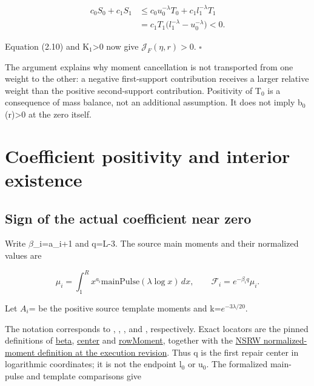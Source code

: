 \documentclass[11pt,a4paper]{article}
\begin{document}
\[
\begin{aligned}
c_0S_0+c_1S_1
&\le c_0u_0^{-\lambda}T_0+c_1l_1^{-\lambda}T_1\\
&=c_1T_1\bigl(l_1^{-\lambda}-u_0^{-\lambda}\bigr)<0.
\end{aligned} \tag{4.3}
\]

Equation (2.10) and K\ensuremath{{}_1}>0 now give \(\mathcal J_F(\eta,r)>0\). \hfill\ensuremath{\square}

The argument explains why moment cancellation is not transported from one weight to the other: a negative first-support contribution receives a larger relative weight than the positive second-support contribution. Positivity of T\ensuremath{{}_0} is a consequence of mass balance, not an additional assumption. It does not imply b\ensuremath{{}_0}(r)>0 at the zero itself.

\section{Coefficient positivity and interior existence}

\subsection{Sign of the actual coefficient near zero}

Write \ensuremath{\beta}\_i=a\_i+1 and q=L-3. The source main moments and their normalized values are

\[
\mu_i=\int_1^R x^{a_i}\mathrm{mainPulse}(\lambda\log x)\,dx,
\qquad \mathcal F_i=e^{-\beta_i q}\mu_i.
\]

Let \(A_i\)= be the positive source template moments and k=\(e^{-3\lambda /20}\).

The notation corresponds to , , ,  and , respectively. Exact locators are the pinned definitions of \href{https://github.com/openai/NavierStokesAndEuler/blob/8937a8f4cbc7abaab5e9e97d1cc7f5d2319d9538/NavierStokes/OutgoingPulseBounds.lean#L178}{beta}, \href{https://github.com/openai/NavierStokesAndEuler/blob/8937a8f4cbc7abaab5e9e97d1cc7f5d2319d9538/NavierStokes/OutgoingPulseBounds.lean#L462}{center} and \href{https://github.com/openai/NavierStokesAndEuler/blob/8937a8f4cbc7abaab5e9e97d1cc7f5d2319d9538/NavierStokes/OutgoingPulseBounds.lean#L493}{rowMoment}, together with the \href{https://github.com/flamehaven01/NavierStokes-Research-Workbench/blob/3a50b5f50b034319a469b9de68f556be70fff02c/formal/p2/P2_L2_NormalizedMainMomentComparison.lean}{NSRW normalized-moment definition at the execution revision}. Thus q is the first repair center in logarithmic coordinates; it is not the endpoint l\ensuremath{{}_0} or u\ensuremath{{}_0}. The formalized main-pulse and template comparisons give
\end{document}
